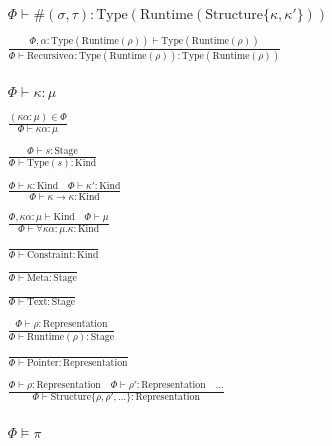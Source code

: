 \documentclass {article}
\begin{document}
\begin{gather*}
{\Phi \vdash \#(\sigma, \tau) : \text{Type} (\text{Runtime} (\text{Structure} \{ \kappa,\kappa'\} ))} \\
\\
\frac
{\Phi, \alpha : \text{Type} (\text{Runtime} (\rho)) \vdash \text{Type} (\text{Runtime} (\rho)) }
{\Phi \vdash \text{Recursive} \alpha : \text{Type} (\text{Runtime} (\rho)) : \text{Type} (\text{Runtime} (\rho))  } \\
\\
\\
\\
\Phi \vdash \kappa : \mu \tag*{[Kind Validation]} \\
\\
\frac
{(\kappa \alpha : \mu) \in \Phi}
{\Phi \vdash \kappa \alpha : \mu } \\
\\
\frac
{\Phi \vdash s : \text{Stage}}
{\Phi \vdash \text {Type} (s) : \text{Kind}} \\
\\
\frac
{\Phi \vdash \kappa : \text{Kind} \quad \Phi \vdash \kappa' : \text{Kind}}
{\Phi \vdash \kappa \to \kappa : \text{Kind} } \\
\\
\frac
{\Phi, \kappa \alpha : \mu \vdash \text{Kind} \quad \Phi \vdash \mu }
{\Phi \vdash \forall \kappa \alpha : \mu. \kappa : \text{Kind}  } \\
\\
\frac
{}
{\Phi \vdash \text{Constraint} : \text{Kind}} \\
\\
\frac
{}
{\Phi \vdash \text{Meta} : \text{Stage}} \\
\\
\frac
{}
{\Phi \vdash \text{Text} : \text{Stage}} \\
\\
\frac
{\Phi \vdash \rho : \text{Representation}}
{\Phi \vdash \text{Runtime} (\rho) : \text{Stage}} \\
\\
\frac
{}
{\Phi \vdash \text{Pointer} : \text{Representation}} \\
\\
\frac
{\Phi \vdash \rho : \text{Representation} \quad \Phi \vdash \rho' : \text{Representation} \quad \dots}
{\Phi \vdash \text{Structure} \{ \rho, \rho', \dots \} : \text{Representation} } \\
\\
\\
\\
\Phi \models \pi \tag*{[Qualified Validation]} \\

\end{gather*}
\end{document}
